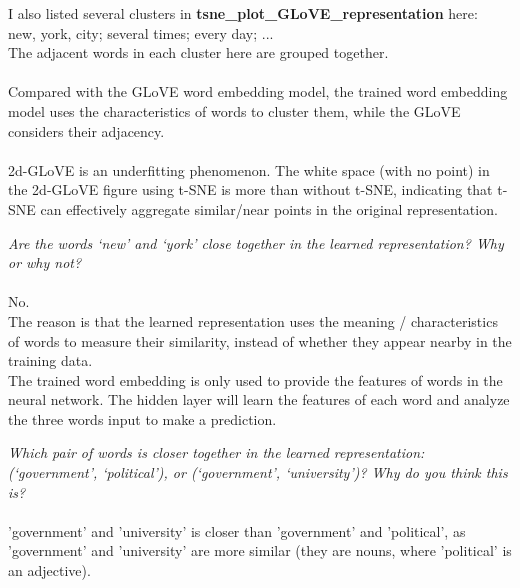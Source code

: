\documentclass{myhw}
\begin{document}
\begin{homeworkProblem}
\begin{homeworkSection}
I also listed several clusters in \textbf{tsne\_plot\_GLoVE\_representation} here: \\
new, york, city; several times; every day; ... \\
The adjacent words in each cluster here are grouped together. \\
\\
Compared with the GLoVE word embedding model, the trained word embedding model uses the characteristics of words to cluster them, while the GLoVE considers their adjacency. \\
\\
2d-GLoVE is an underfitting phenomenon. 
The white space (with no point) in the 2d-GLoVE figure using t-SNE is more than without t-SNE, indicating that t-SNE can effectively aggregate similar/near points in the original representation.
\end{homeworkSection}
\begin{homeworkSection}
\emph{Are the words ‘new’ and ‘york’ close together in the learned representation? Why or why not?} \\
\\
No. \\
The reason is that the learned representation uses the meaning / characteristics of words to measure their similarity, instead of whether they appear nearby in the training data. \\
The trained word embedding is only used to provide the features of words in the neural network. The hidden layer will learn the features of each word and analyze the three words input to make a prediction.
\end{homeworkSection}
\begin{homeworkSection}
\emph{Which pair of words is closer together in the learned representation: (‘government’, ‘political’), or (‘government’, ‘university’)? Why do you think this is?} \\
\\
'government' and 'university' is closer than 'government' and 'political', as 'government' and 'university' are more similar (they are nouns, where 'political' is an adjective).
\end{homeworkSection}
\end{homeworkProblem}
\end{document}
